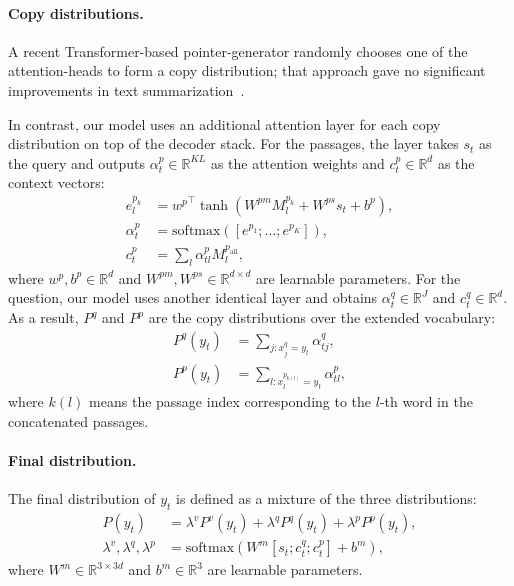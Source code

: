 \documentclass[11pt,a4paper]{article}
\theoremstyle{mydef}
\theoremstyle{myprob}
\begin{document}
\paragraph{Copy distributions.}
A recent Transformer-based pointer-generator
randomly chooses one of the attention-heads to form a copy distribution; 
that approach gave no significant improvements in text summarization~\citep{GehrmannDR18}.

In contrast, our model uses an additional attention layer for each copy distribution on top of the decoder stack. For the passages, the layer takes $s_t$ as the query and outputs 
$\alpha^p_t \in \mathbb{R}^{KL}$ as the attention weights and 
$c^p_t \in \mathbb{R}^d$ as the context vectors:
\begin{align}
\nonumber
e^{p_k}_l &= {w^p}^\top \tanh(W^{pm} M_l^{p_k} + W^{ps} s_t +b^p), \\
\label{eq:wordattn}
\alpha^p_t &= \mathrm{softmax}([e^{p_1}; \ldots; e^{p_K}]), \\
\nonumber
c^p_t &=  \textstyle \sum_{l} \alpha^p_{tl} M^{p_\mathrm{all}}_{l}, 
\end{align}
where $w^p, b^p \in \mathbb{R}^d$ and $W^{pm}, W^{ps} \in \mathbb{R}^{d \times d}$
are learnable parameters. 
For the question, our model uses another identical layer
and obtains $\alpha^q_t \in \mathbb{R}^J$ and $c^q_t \in \mathbb{R}^d$. 
%
As a result, $P^q$ and $P^p$ are the copy distributions over the extended vocabulary: \begin{align}
\nonumber
P^q(y_t) &=  \textstyle \sum_{j: x^q_j = y_t} \alpha^q_{tj},\\ \nonumber
P^p(y_t) &= \textstyle \sum_{l: x^{p_{k(l)}}_{l} = y_t} \alpha^p_{tl},
\end{align}
where $k(l)$ means the passage index corresponding to the $l$-th word in the concatenated passages.

\paragraph{Final distribution.}

The final distribution of $y_t$ is defined as a mixture of the three distributions:
\begin{align}
\nonumber
P(y_t) &= \lambda^v P^v(y_t) +  \lambda^q P^q(y_t) + \lambda^p P^p(y_t), \\
\nonumber
\lambda^v, \lambda^q, \lambda^p &= \mathrm{softmax}(W^m [s_t; c^q_t; c^p_t] + b^m),
\end{align}
where $W^m \in \mathbb{R}^{3 \times 3d}$ and $b^m \in \mathbb{R}^3$ are learnable parameters.
\end{document}
